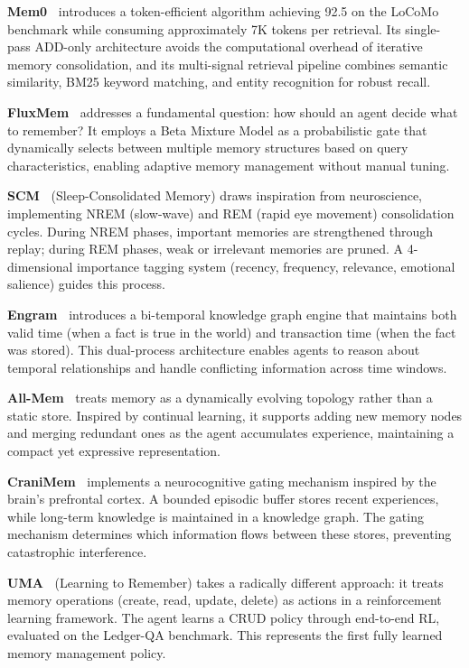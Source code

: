 \textbf{Mem0~\cite{Unknown2025Mem0}} introduces a token-efficient algorithm achieving 92.5 on the LoCoMo benchmark while consuming approximately 7K tokens per retrieval. Its single-pass ADD-only architecture avoids the computational overhead of iterative memory consolidation, and its multi-signal retrieval pipeline combines semantic similarity, BM25 keyword matching, and entity recognition for robust recall.

\textbf{FluxMem~\cite{Unknown2026FluxMem}} addresses a fundamental question: how should an agent decide what to remember? It employs a Beta Mixture Model as a probabilistic gate that dynamically selects between multiple memory structures based on query characteristics, enabling adaptive memory management without manual tuning.

\textbf{SCM~\cite{Unknown2026SCM}} (Sleep-Consolidated Memory) draws inspiration from neuroscience, implementing NREM (slow-wave) and REM (rapid eye movement) consolidation cycles. During NREM phases, important memories are strengthened through replay; during REM phases, weak or irrelevant memories are pruned. A 4-dimensional importance tagging system (recency, frequency, relevance, emotional salience) guides this process.

\textbf{Engram~\cite{Unknown2026Engram}} introduces a bi-temporal knowledge graph engine that maintains both valid time (when a fact is true in the world) and transaction time (when the fact was stored). This dual-process architecture enables agents to reason about temporal relationships and handle conflicting information across time windows.

\textbf{All-Mem~\cite{Unknown2026AllMem}} treats memory as a dynamically evolving topology rather than a static store. Inspired by continual learning, it supports adding new memory nodes and merging redundant ones as the agent accumulates experience, maintaining a compact yet expressive representation.

\textbf{CraniMem~\cite{Unknown2026CraniMem}} implements a neurocognitive gating mechanism inspired by the brain's prefrontal cortex. A bounded episodic buffer stores recent experiences, while long-term knowledge is maintained in a knowledge graph. The gating mechanism determines which information flows between these stores, preventing catastrophic interference.

\textbf{UMA~\cite{Unknown2026LearningtoRemember}} (Learning to Remember) takes a radically different approach: it treats memory operations (create, read, update, delete) as actions in a reinforcement learning framework. The agent learns a CRUD policy through end-to-end RL, evaluated on the Ledger-QA benchmark. This represents the first fully learned memory management policy.

